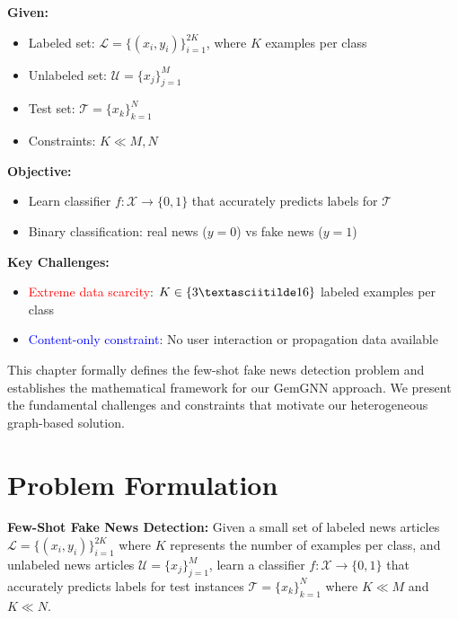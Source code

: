 
\vspace{0.3cm}

\textbf{Given:}
\begin{itemize}
    \item Labeled set: $\mathcal{L} = \{(x_i, y_i)\}_{i=1}^{2K}$, where $K$ examples per class
    \item Unlabeled set: $\mathcal{U} = \{x_j\}_{j=1}^{M}$ 
    \item Test set: $\mathcal{T} = \{x_k\}_{k=1}^{N}$
    \item Constraints: $K \ll M, N$
\end{itemize}

\vspace{0.3cm}

\textbf{Objective:}
\begin{itemize}
    \item Learn classifier $f: \mathcal{X} \rightarrow \{0, 1\}$ that accurately predicts labels for $\mathcal{T}$
    \item Binary classification: real news ($y = 0$) vs fake news ($y = 1$)
\end{itemize}

\vspace{0.3cm}

\textbf{Key Challenges:}
\begin{itemize}
    \item \textcolor{red}{Extreme data scarcity}: $K \in \{3 \textasciitilde 16\}$ labeled examples per class
    \item \textcolor{blue}{Content-only constraint}: No user interaction or propagation data available
\end{itemize}


This chapter formally defines the few-shot fake news detection problem and establishes the mathematical framework for our GemGNN approach. We present the fundamental challenges and constraints that motivate our heterogeneous graph-based solution.

\section{Problem Formulation}

\textbf{Few-Shot Fake News Detection:} Given a small set of labeled news articles $\mathcal{L} = \{(x_i, y_i)\}_{i=1}^{2K}$ where $K$ represents the number of examples per class, and unlabeled news articles $\mathcal{U} = \{x_j\}_{j=1}^{M}$, learn a classifier $f: \mathcal{X} \rightarrow \{0,1\}$ that accurately predicts labels for test instances $\mathcal{T} = \{x_k\}_{k=1}^{N}$ where $K \ll M$ and $K \ll N$.

